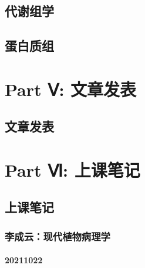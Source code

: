 \documentclass[
  10pt,
]{book}
\begin{document}
\hypertarget{liter-meta}{%
\chapter{代谢组学}\label{liter-meta}}

\hypertarget{liter-pro}{%
\chapter{蛋白质组}\label{liter-pro}}

\hypertarget{part-part-ux2174-ux6587ux7ae0ux53d1ux8868}{%
\part*{Part Ⅴ: 文章发表}\label{part-part-ux2174-ux6587ux7ae0ux53d1ux8868}}

\hypertarget{myarticle}{%
\chapter{文章发表}\label{myarticle}}

\hypertarget{part-part-ux2175-ux4e0aux8bfeux7b14ux8bb0}{%
\part*{Part Ⅵ: 上课笔记}\label{part-part-ux2175-ux4e0aux8bfeux7b14ux8bb0}}

\hypertarget{class}{%
\chapter{上课笔记}\label{class}}

\hypertarget{ux674eux6210ux4e91ux73b0ux4ee3ux690dux7269ux75c5ux7406ux5b66}{%
\section{李成云：现代植物病理学}\label{ux674eux6210ux4e91ux73b0ux4ee3ux690dux7269ux75c5ux7406ux5b66}}

\hypertarget{section}{%
\subsection{20211022}\label{section}}
\end{document}
